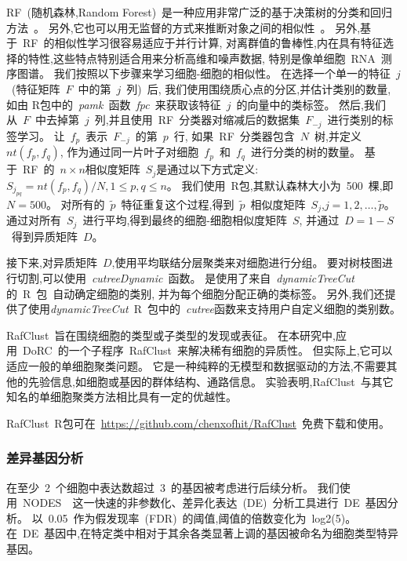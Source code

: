 RF~(随机森林,Random Forest)~是一种应用非常广泛的基于决策树的分类和回归方法~\cite{breiman2001random}。
另外,它也可以用无监督的方式来推断对象之间的相似性~\cite{shi2006unsupervised,breiman2011manual,pouyan2018random}。
另外,基于~RF~的相似性学习很容易适应于并行计算,
对离群值的鲁棒性,内在具有特征选择的特性,这些特点特别适合用来分析高维和噪声数据,
特别是像单细胞~RNA~测序图谱。
我们按照以下步骤来学习细胞-细胞的相似性。
在选择一个单一的特征~$j$~(特征矩阵~$F$~中的第~$j$~列)~后, 
我们使用围绕质心点的分区,并估计类别的数量,如由 
R包中的~\textit{pamk}~函数~\textit{fpc}~\cite{package-fpc}来获取该特征~$j$~的向量中的类标签。
然后,我们从~$F$~中去掉第~$j$~列,并且使用~RF~分类器对缩减后的数据集~$F_{-j}$~进行类别的标签学习。
让~$f_p$~表示~$F_{-j}$~的第~$p$~行,
如果~RF~分类器包含~$N$~树,并定义~$nt(f_p,f_q)$, 作为通过同一片叶子对细胞~$f_p$~和~$f_q$~进行分类的树的数量。
基于~RF~的~$n \times n$相似度矩阵~$S_j$是通过以下方式定义:
$S_{j_{pq}} = nt(f_p,f_q) / N, 1 \le p,q \le n$。
我们使用~R包\cite{package-randomforest},其默认森林大小为~500~棵,即~$N=500$。
对所有的~$\tilde{p}$~特征重复这个过程,得到~$\tilde{p}$~相似度矩阵~$S_j$,$j=1,2,\ldots,\tilde{p}$。
通过对所有~$S_j$~进行平均,得到最终的细胞-细胞相似度矩阵~$S$,
并通过~$D=1-S$~得到异质矩阵~$D$。

接下来,对异质矩阵~$D$,使用平均联结分层聚类来对细胞进行分组。
要对树枝图进行切割,可以使用~\textit{cutreeDynamic}~函数。
是使用了来自~\textit{dynamicTreeCut}的~R~包~\cite{langfelder2007defining,package-dynamicTreeCut}自动确定细胞的类别,
并为每个细胞分配正确的类标签。
另外,我们还提供了使用\textit{dynamicTreeCut}~R~包中的~\textit{cutree}函数来支持用户自定义细胞的类别数。


RafClust~旨在围绕细胞的类型或子类型的发现或表征。
在本研究中,应用~DoRC~的一个子程序~RafClust~来解决稀有细胞的异质性。
但实际上,它可以适应一般的单细胞聚类问题。
它是一种纯粹的无模型和数据驱动的方法,不需要其他的先验信息,如细胞或基因的群体结构、通路信息。
实验表明,RafClust~与其它知名的单细胞聚类方法相比具有一定的优越性。

RafClust~R包可在~\url{https://github.com/chenxofhit/RafClust}~免费下载和使用。

\subsubsection{差异基因分析}
\label{subsec:de}
在至少~2~个细胞中表达数超过~3~的基因被考虑进行后续分析。
我们使用~NODES~\cite{Sengupta049734}~这一快速的非参数化、差异化表达~(DE)~分析工具进行~DE~基因分析。
以~0.05~作为假发现率~(FDR)~的阈值,阈值的倍数变化为~log2(5)。
在~DE~基因中,在特定类中相对于其余各类显著上调的基因被命名为细胞类型特异基因。

